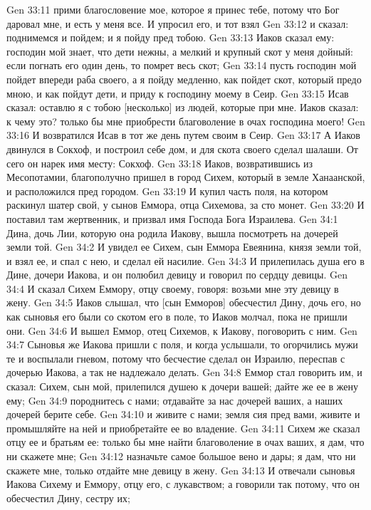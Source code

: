 Gen 33:11  прими благословение мое, которое я принес тебе, потому что Бог даровал мне, и есть у меня все. И упросил его, и тот взял
Gen 33:12  и сказал: поднимемся и пойдем; и я пойду пред тобою.
Gen 33:13  Иаков сказал ему: господин мой знает, что дети нежны, а мелкий и крупный скот у меня дойный: если погнать его один день, то помрет весь скот;
Gen 33:14  пусть господин мой пойдет впереди раба своего, а я пойду медленно, как пойдет скот, который предо мною, и как пойдут дети, и приду к господину моему в Сеир.
Gen 33:15  Исав сказал: оставлю я с тобою [несколько] из людей, которые при мне. Иаков сказал: к чему это? только бы мне приобрести благоволение в очах господина моего!
Gen 33:16  И возвратился Исав в тот же день путем своим в Сеир.
Gen 33:17  А Иаков двинулся в Сокхоф, и построил себе дом, и для скота своего сделал шалаши. От сего он нарек имя месту: Сокхоф.
Gen 33:18  Иаков, возвратившись из Месопотамии, благополучно пришел в город Сихем, который в земле Ханаанской, и расположился пред городом.
Gen 33:19  И купил часть поля, на котором раскинул шатер свой, у сынов Еммора, отца Сихемова, за сто монет.
Gen 33:20  И поставил там жертвенник, и призвал имя Господа Бога Израилева.
Gen 34:1  Дина, дочь Лии, которую она родила Иакову, вышла посмотреть на дочерей земли той.
Gen 34:2  И увидел ее Сихем, сын Еммора Евеянина, князя земли той, и взял ее, и спал с нею, и сделал ей насилие.
Gen 34:3  И прилепилась душа его в Дине, дочери Иакова, и он полюбил девицу и говорил по сердцу девицы.
Gen 34:4  И сказал Сихем Еммору, отцу своему, говоря: возьми мне эту девицу в жену.
Gen 34:5  Иаков слышал, что [сын Емморов] обесчестил Дину, дочь его, но как сыновья его были со скотом его в поле, то Иаков молчал, пока не пришли они.
Gen 34:6  И вышел Еммор, отец Сихемов, к Иакову, поговорить с ним.
Gen 34:7  Сыновья же Иакова пришли с поля, и когда услышали, то огорчились мужи те и воспылали гневом, потому что бесчестие сделал он Израилю, переспав с дочерью Иакова, а так не надлежало делать.
Gen 34:8  Еммор стал говорить им, и сказал: Сихем, сын мой, прилепился душею к дочери вашей; дайте же ее в жену ему;
Gen 34:9  породнитесь с нами; отдавайте за нас дочерей ваших, а наших дочерей берите себе.
Gen 34:10  и живите с нами; земля сия пред вами, живите и промышляйте на ней и приобретайте ее во владение.
Gen 34:11  Сихем же сказал отцу ее и братьям ее: только бы мне найти благоволение в очах ваших, я дам, что ни скажете мне;
Gen 34:12  назначьте самое большое вено и дары; я дам, что ни скажете мне, только отдайте мне девицу в жену.
Gen 34:13  И отвечали сыновья Иакова Сихему и Еммору, отцу его, с лукавством; а говорили так потому, что он обесчестил Дину, сестру их;
